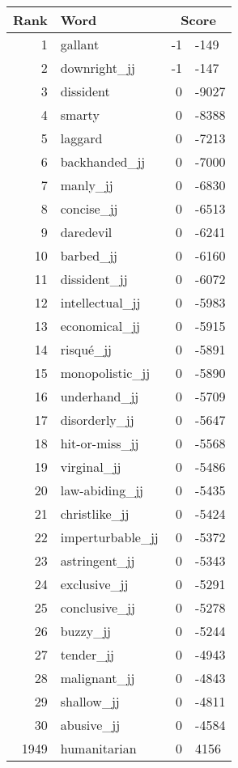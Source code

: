 \begin{longtable}[!htbp]{| rlr@{.}l |}
    \hline
    \textbf{Rank} & \textbf{Word} & \multicolumn{2}{c|}{\textbf{Score}} \\
    \hline
    \endhead
    1 & gallant & -1 & -149 \\
    2 & downright\_jj & -1 & -147 \\
    3 & dissident & 0 & -9027 \\
    4 & smarty & 0 & -8388 \\
    5 & laggard & 0 & -7213 \\
    6 & backhanded\_jj & 0 & -7000 \\
    7 & manly\_jj & 0 & -6830 \\
    8 & concise\_jj & 0 & -6513 \\
    9 & daredevil & 0 & -6241 \\
    10 & barbed\_jj & 0 & -6160 \\
    11 & dissident\_jj & 0 & -6072 \\
    12 & intellectual\_jj & 0 & -5983 \\
    13 & economical\_jj & 0 & -5915 \\
    14 & risqué\_jj & 0 & -5891 \\
    15 & monopolistic\_jj & 0 & -5890 \\
    16 & underhand\_jj & 0 & -5709 \\
    17 & disorderly\_jj & 0 & -5647 \\
    18 & hit-or-miss\_jj & 0 & -5568 \\
    19 & virginal\_jj & 0 & -5486 \\
    20 & law-abiding\_jj & 0 & -5435 \\
    21 & christlike\_jj & 0 & -5424 \\
    22 & imperturbable\_jj & 0 & -5372 \\
    23 & astringent\_jj & 0 & -5343 \\
    24 & exclusive\_jj & 0 & -5291 \\
    25 & conclusive\_jj & 0 & -5278 \\
    26 & buzzy\_jj & 0 & -5244 \\
    27 & tender\_jj & 0 & -4943 \\
    28 & malignant\_jj & 0 & -4843 \\
    29 & shallow\_jj & 0 & -4811 \\
    30 & abusive\_jj & 0 & -4584 \\
    1949 & humanitarian & 0 & 4156 \\

\end{longtable}
